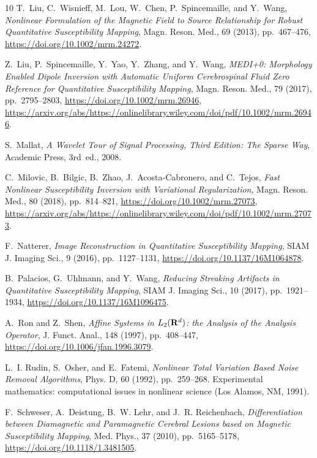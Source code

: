 \documentclass[reqno]{siamonline1116}
\numberwithin{theorem}{section}
\numberwithin{equation}{section}
\begin{document}
\begin{thebibliography}{10}
{\sc T.~Liu, C.~Wisnieff, M.~Lou, W.~Chen, P.~Spincemaille, and Y.~Wang}, {\em
  {Nonlinear Formulation of the Magnetic Field to Source Relationship for
  Robust Quantitative Susceptibility Mapping}}, Magn. Reson. Med., 69 (2013),
  pp.~467--476, \url{https://doi.org/10.1002/mrm.24272}.

{\sc Z.~Liu, P.~Spincemaille, Y.~Yao, Y.~Zhang, and Y.~Wang}, {\em {MEDI+0:
  Morphology Enabled Dipole Inversion with Automatic Uniform Cerebrospinal
  Fluid Zero Reference for Quantitative Susceptibility Mapping}}, Magn. Reson.
  Med., 79 (2017), pp.~2795--2803, \url{https://doi.org/10.1002/mrm.26946},
  \url{https://arxiv.org/abs/https://onlinelibrary.wiley.com/doi/pdf/10.1002/mrm.26946}.

{\sc S.~Mallat}, {\em {A Wavelet Tour of Signal Processing, Third Edition: The
  Sparse Way}}, Academic Press, 3rd~ed., 2008.

{\sc C.~Milovic, B.~Bilgic, B.~Zhao, J.~Acosta-Cabronero, and C.~Tejos}, {\em
  {Fast Nonlinear Susceptibility Inversion with Variational Regularization}},
  Magn. Reson. Med., 80 (2018), pp.~814--821,
  \url{https://doi.org/10.1002/mrm.27073},
  \url{https://arxiv.org/abs/https://onlinelibrary.wiley.com/doi/pdf/10.1002/mrm.27073}.

{\sc F.~Natterer}, {\em {Image Reconstruction in Quantitative Susceptibility
  Mapping}}, SIAM J. Imaging Sci., 9 (2016), pp.~1127--1131,
  \url{https://doi.org/10.1137/16M1064878}.

{\sc B.~Palacios, G.~Uhlmann, and Y.~Wang}, {\em {Reducing Streaking Artifacts
  in Quantitative Susceptibility Mapping}}, SIAM J. Imaging Sci., 10 (2017),
  pp.~1921--1934, \url{https://doi.org/10.1137/16M1096475}.

{\sc A.~Ron and Z.~Shen}, {\em {Affine Systems in {$L_2(\bold R^d)$}: the
  Analysis of the Analysis Operator}}, J. Funct. Anal., 148 (1997),
  pp.~408--447, \url{https://doi.org/10.1006/jfan.1996.3079}.

{\sc L.~I. Rudin, S.~Osher, and E.~Fatemi}, {\em {Nonlinear Total Variation
  Based Noise Removal Algorithms}}, Phys. D, 60 (1992), pp.~259--268.
\newblock Experimental mathematics: computational issues in nonlinear science
  (Los Alamos, NM, 1991).

{\sc F.~Schweser, A.~Deistung, B.~W. Lehr, and J.~R. Reichenbach}, {\em
  {Differentiation between Diamagnetic and Paramagnetic Cerebral Lesions based
  on Magnetic Susceptibility Mapping}}, Med. Phys., 37 (2010), pp.~5165--5178,
  \url{https://doi.org/10.1118/1.3481505}.


\end{thebibliography}
\end{document}
